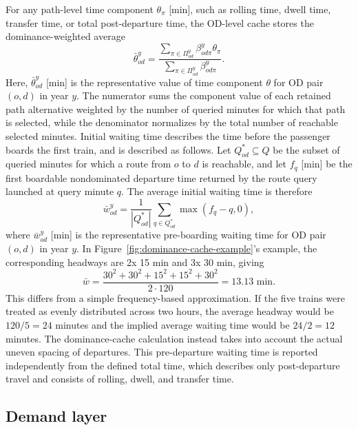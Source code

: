 \documentclass[preprint,12pt]{elsarticle}
\begin{document}
For any path-level time component $\theta_\pi$ [min], such as rolling time, dwell time, transfer time, or total post-departure time, the OD-level cache stores the dominance-weighted average
\begin{equation}
  \bar\theta^y_{od}=\frac{\sum_{\pi\in\Pi^y_{od}} \beta^y_{od\pi}\theta_\pi}
  {\sum_{\pi\in\Pi^y_{od}} \beta^y_{od\pi}}.
  \label{eq:dominance-weighted-od-metric}
\end{equation}
Here, $\bar\theta^y_{od}$ [min] is the representative value of time component $\theta$ for OD pair $(o,d)$ in year $y$. The numerator sums the component value of each retained path alternative weighted by the number of queried minutes for which that path is selected, while the denominator normalizes by the total number of reachable selected minutes. 
Initial waiting time describes the time before the passenger boards the first train, and is described as follows. Let $Q^*_{od}\subseteq Q$ be the subset of queried minutes for which a route from $o$ to $d$ is reachable, and let $f_q$ [min] be the first boardable nondominated departure time returned by the route query launched at query minute $q$. The average initial waiting time is therefore
\begin{equation}
  \bar w^y_{od}=\frac{1}{|Q^*_{od}|}\sum_{q\in Q^*_{od}}\max(f_q-q,0),
  \label{eq:part1-initial-wait}
\end{equation}
where $\bar w^y_{od}$ [min] is the representative pre-boarding waiting time for OD pair $(o,d)$ in year $y$. In Figure~\ref{fig:dominance-cache-example}'s example, the corresponding headways are 2x 15 min and 3x 30 min, giving
\begin{equation}
  \bar w =
  \frac{30^2+30^2+15^2+15^2+30^2}{2\cdot120}
  =13.13\text{ min}.
  \label{eq:dominance-example-waiting-time}
\end{equation}
This differs from a simple frequency-based approximation. If the five trains were treated as evenly distributed across two hours, the average headway would be $120/5=24$ minutes and the implied average waiting time would be $24/2=12$ minutes. The dominance-cache calculation instead takes into account the actual uneven spacing of departures. This pre-departure waiting time is reported independently from the defined total time, which describes only post-departure travel and consists of rolling, dwell, and transfer time.

\subsection{Demand layer}\label{sec:demand}
\end{document}
